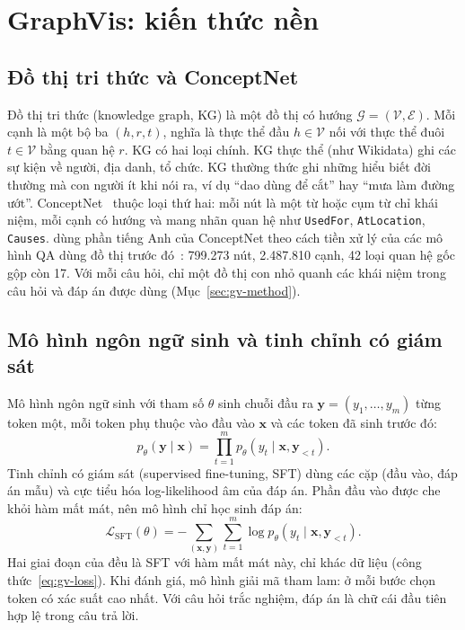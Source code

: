 \section{GraphVis: kiến thức nền}\label{sec:gv-background}

\subsection{Đồ thị tri thức và ConceptNet}
Đồ thị tri thức (knowledge graph, KG) là một đồ thị có hướng $\mathcal{G}=(\mathcal{V},\mathcal{E})$. Mỗi cạnh là một bộ ba $(h,r,t)$, nghĩa là thực thể đầu $h\in\mathcal{V}$ nối với thực thể đuôi $t\in\mathcal{V}$ bằng quan hệ $r$. KG có hai loại chính. KG thực thể (như Wikidata) ghi các sự kiện về người, địa danh, tổ chức. KG thường thức ghi những hiểu biết đời thường mà con người ít khi nói ra, ví dụ ``dao dùng để cắt'' hay ``mưa làm đường ướt''. ConceptNet~\cite{speer2017conceptnet} thuộc loại thứ hai: mỗi nút là một từ hoặc cụm từ chỉ khái niệm, mỗi cạnh có hướng và mang nhãn quan hệ như \texttt{UsedFor}, \texttt{AtLocation}, \texttt{Causes}. \GV{} dùng phần tiếng Anh của ConceptNet theo cách tiền xử lý của các mô hình QA dùng đồ thị trước đó~\cite{feng2020mhgrn,yasunaga2021qagnn}: 799.273 nút, 2.487.810 cạnh, 42 loại quan hệ gốc gộp còn 17. Với mỗi câu hỏi, chỉ một đồ thị con nhỏ quanh các khái niệm trong câu hỏi và đáp án được dùng (Mục~\ref{sec:gv-method}).

\subsection{Mô hình ngôn ngữ sinh và tinh chỉnh có giám sát}
Mô hình ngôn ngữ sinh với tham số $\theta$ sinh chuỗi đầu ra $\mathbf{y}=(y_1,\dots,y_m)$ từng token một, mỗi token phụ thuộc vào đầu vào $\mathbf{x}$ và các token đã sinh trước đó:
\begin{equation}
p_\theta(\mathbf{y}\mid\mathbf{x})=\prod_{t=1}^{m}p_\theta(y_t\mid\mathbf{x},\mathbf{y}_{<t}).
\end{equation}
Tinh chỉnh có giám sát (supervised fine-tuning, SFT) dùng các cặp (đầu vào, đáp án mẫu) và cực tiểu hóa log-likelihood âm của đáp án. Phần đầu vào được che khỏi hàm mất mát, nên mô hình chỉ học sinh đáp án:
\begin{equation}
\mathcal{L}_{\text{SFT}}(\theta)=-\sum_{(\mathbf{x},\mathbf{y})}\sum_{t=1}^{m}\log p_\theta(y_t\mid\mathbf{x},\mathbf{y}_{<t}).
\end{equation}
Hai giai đoạn của \GV{} đều là SFT với hàm mất mát này, chỉ khác dữ liệu (công thức~\eqref{eq:gv-loss}). Khi đánh giá, mô hình giải mã tham lam: ở mỗi bước chọn token có xác suất cao nhất. Với câu hỏi trắc nghiệm, đáp án là chữ cái đầu tiên hợp lệ trong câu trả lời.

